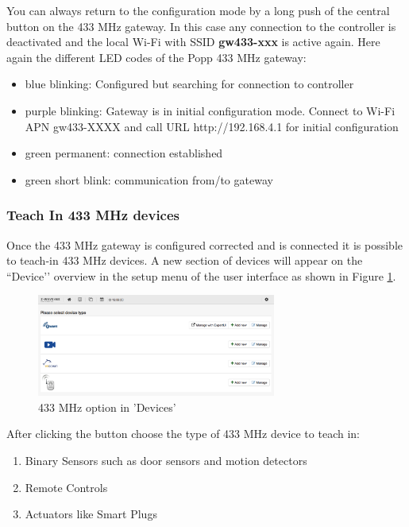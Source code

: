 You can always return to the configuration mode by a long push of the central button on 
the 433 MHz gateway. In this case any connection to the \zway controller is deactivated 
and the local Wi-Fi with SSID \textbf{gw433-xxx } is active again.
Here again the different LED codes of the Popp 433 MHz gateway:

\begin{itemize}
\item blue blinking: Configured but searching for connection to \zway controller
\item purple blinking: Gateway is in initial configuration mode. Connect to Wi-Fi APN gw433-XXXX and call URL http://192.168.4.1 for initial configuration
\item green permanent: connection established
\item green short blink: communication from/to gateway
\end{itemize}

\subsubsection {Teach In 433 MHz devices}

Once the 433 MHz gateway is configured corrected and is connected it is possible to 
teach-in 433 MHz devices. A new section of devices will appear on the ``Device’’ overview in 
the setup menu of the user interface as shown in Figure \ref{433_5}.

\begin{figure}
\begin{center}
\includegraphics[width=0.7\textwidth]{pngs/cap4/433_5.png}
\caption{433 MHz option in 'Devices'}
\label{433_5}
\end{center}
\end{figure}

After clicking the  button choose the type of 433 MHz device to teach in:
\begin{enumerate}
\item Binary Sensors such as door sensors and motion detectors
\item Remote Controls
\item Actuators like Smart Plugs
\end{enumerate}

